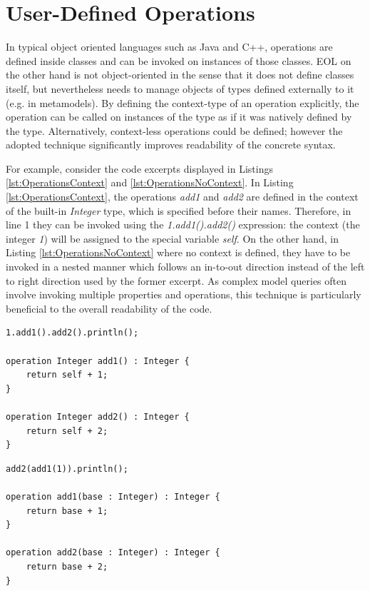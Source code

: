 \section{User-Defined Operations}
\label{sec:Design.EOL.Operations}

In typical object oriented languages such as Java and C++, operations are defined inside classes and can be invoked on instances of those classes. EOL on the other hand is not object-oriented in the sense that it does not define classes itself, but nevertheless needs to manage objects of types defined externally to it (e.g. in metamodels). By defining the context-type of an operation explicitly, the operation can be called on instances of the type as if it was natively defined by the type. Alternatively, context-less operations could be defined; however the adopted technique significantly improves readability of the concrete syntax.

For example, consider the code excerpts displayed in Listings \ref{lst:OperationsContext} and \ref{lst:OperationsNoContext}. In Listing \ref{lst:OperationsContext}, the operations \emph{add1} and \emph{add2} are defined in the context of the built-in \emph{Integer} type, which is specified before their names. Therefore, in line 1 they can be invoked using the \emph{1.add1().add2()} expression: the context (the integer \emph{1}) will be assigned to the special variable \emph{self}. On the other hand, in Listing \ref{lst:OperationsNoContext} where no context is defined, they have to be invoked in a nested manner which follows an in-to-out direction instead of the left to right direction used by the former excerpt. As complex model queries often involve invoking multiple properties and operations, this technique is particularly beneficial to the overall readability of the code.

\begin{lstlisting}[basicstyle=\ttfamily\footnotesize, flexiblecolumns=true, numbers=none, nolol=true, caption=Exemplar context-defining EOL operations, label=lst:OperationsContext, numbers=left, language=EOL, tabsize=2]
1.add1().add2().println();

operation Integer add1() : Integer {
	return self + 1;
}

operation Integer add2() : Integer {
	return self + 2;
}
\end{lstlisting}

\begin{lstlisting}[basicstyle=\ttfamily\footnotesize, flexiblecolumns=true, numbers=none, nolol=true, caption=Exemplar EOL context-less EOL operations, label=lst:OperationsNoContext, numbers=left, language=EOL, tabsize=2]
add2(add1(1)).println();

operation add1(base : Integer) : Integer {
	return base + 1;
}

operation add2(base : Integer) : Integer {
	return base + 2;
}
\end{lstlisting}

